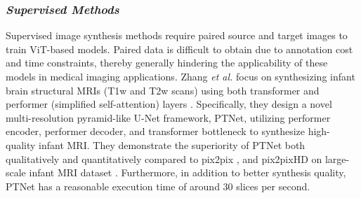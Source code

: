 \documentclass[10pt,journal,compsoc]{IEEEtran}
\begin{document}
\subsubsection{\textbf{\textit{Supervised Methods}}} Supervised image synthesis methods require paired source and target images to train ViT-based models. Paired data is difficult to obtain due to annotation cost and time constraints, thereby generally hindering the applicability of these models in medical imaging applications. Zhang \textit{et al.} \cite{zhang2021ptnet} focus on synthesizing infant brain structural MRIs (T1w and T2w scans) using both transformer and performer (simplified self-attention) layers \cite{choromanski2020rethinking}. Specifically, they design a novel multi-resolution pyramid-like U-Net framework, PTNet, utilizing performer encoder, performer decoder, and transformer bottleneck to synthesize high-quality infant MRI. They demonstrate the superiority of PTNet both qualitatively and quantitatively compared to pix2pix \cite{isola2017image}, and pix2pixHD \cite{wang2018high} on large-scale infant MRI dataset \cite{makropoulos2018developing}. Furthermore, in addition to better synthesis quality, PTNet has a reasonable execution time of around 30 slices per second.
\end{document}

